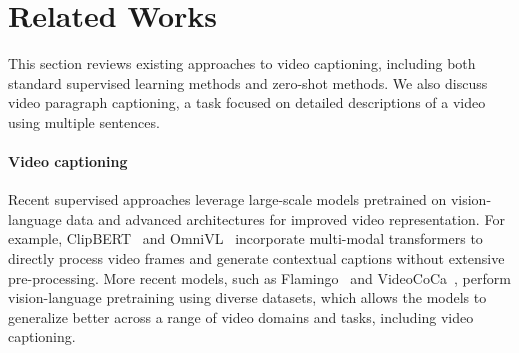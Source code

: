 
\section{Related Works}
\label{sec:related}

This section reviews existing approaches to video captioning, including both standard supervised learning methods and zero-shot methods. 
We also discuss video paragraph captioning, a task focused on detailed descriptions of a video using multiple sentences.

\vspace{-2mm}
\paragraph{Video captioning}
Recent supervised approaches leverage large-scale models pretrained on vision-language data and advanced architectures for improved video representation. 
For example, ClipBERT~\cite{lei2021less} and OmniVL~\cite{wang2022omnivl} incorporate multi-modal transformers to directly process video frames and generate contextual captions without extensive pre-processing.
More recent models, such as Flamingo~\cite{alayrac2022flamingo} and VideoCoCa~\cite{yan2022videococa}, perform vision-language pretraining using diverse datasets, which allows the models to generalize better across a range of video domains and tasks, including video captioning.

\vspace{-2mm}
